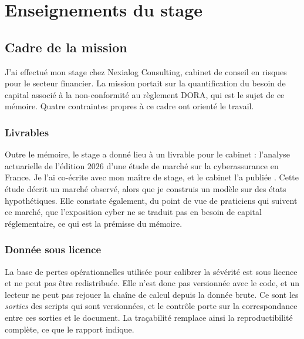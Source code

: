 \chapter*{Enseignements du stage}
{}
\label{ens:ch}
\label{part:stage}




\section*{Cadre de la mission}
\label{ens:cadre}

J'ai effectué mon stage chez Nexialog Consulting, cabinet de conseil en risques pour le secteur
financier. La mission portait sur la quantification du besoin de capital associé à la
non-conformité au règlement DORA, qui est le sujet de ce mémoire. Quatre contraintes propres à ce
cadre ont orienté le travail.

\subsection*{Livrables}
Outre le mémoire, le stage a donné lieu à un livrable pour le cabinet : l'analyse actuarielle de
l'édition $2026$ d'une étude de marché sur la cyberassurance en France. Je l'ai co-écrite avec mon
maître de stage, et le cabinet l'a publiée \citep{RapiorKaddouri2026}. Cette étude décrit un
marché observé, alors que je construis un modèle sur des états hypothétiques. Elle constate
également, du point de vue de praticiens qui suivent ce marché, que l'exposition cyber ne se traduit
pas en besoin de capital réglementaire, ce qui est la prémisse du mémoire.

\subsection*{Donnée sous licence}
La base de pertes opérationnelles utilisée pour calibrer la sévérité est sous licence et ne peut pas
être redistribuée. Elle n'est donc pas versionnée avec le code, et un lecteur ne peut pas rejouer la
chaîne de calcul depuis la donnée brute. Ce sont les \emph{sorties} des scripts qui sont versionnées,
et le contrôle porte sur la correspondance entre ces sorties et le document. La traçabilité remplace
ainsi la reproductibilité complète, ce que le rapport indique.


